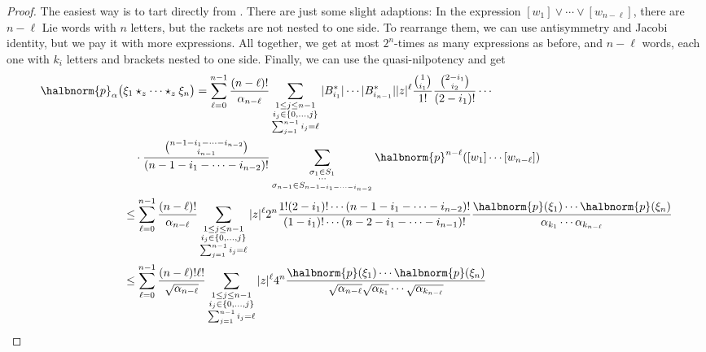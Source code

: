 \documentclass[
11pt,                          %
english                        %
]{article}
\begin{document}
\begin{proof}
	The easiest way is to tart directly from \cite[Equation (5.3.14)]{stapor:2015a}.
	There are just some slight adaptions: In the expression 
	$[w_1] \vee \cdots \vee [w_{n-\ell}]$, there are $n - \ell$ Lie words with $n$
	letters, but the rackets are not nested to one side. To rearrange them, we can 
	use antisymmetry and Jacobi identity, but we pay it with more expressions. All 
	together, we get at most $2^n$-times as many expressions as before, and $n - 
	\ell$ words, each one with $k_i$ letters and brackets nested to one side. 
	Finally, we can use the quasi-nilpotency and get
	\begin{align*}
		\halbnorm{p}_\alpha
		\big(
		&
			\xi_1 \star_z \cdots \star_z \xi_n
		\big)
		=
		\sum\limits_{\ell = 0}^{n-1}
		\frac{(n-\ell)!}{\alpha_{n - \ell}}
		\sum\limits_{\substack{
			1 \leq j \leq n-1 \\
			i_j \in \{0, \ldots, j\} \\
			\sum_{j=1}^{n-1} i_j = \ell
		}}
		|B_{i_1}^*| \cdots |B_{i_{n-1}}^*|
		|z|^\ell
		\frac{\binom{1}{i_1}}{1!}
		\frac{\binom{2 - i_1}{i_2}}{(2 - i_1)!}
		\cdots
		\\
		& \quad \cdot
		\frac{\binom{n - 1 - i_1 - \cdots - i_{n-2}}{i_{n-1}}}
		{(n - 1 - i_1 - \cdots - i_{n-2})!}
		\sum\limits_{\substack{
			\sigma_1 \in S_1 \\
			\cdots \\
			\sigma_{n-1} \in S_{n - 1 - i_1 - \cdots - i_{n-2}} 
		}}
		\halbnorm{p}^{n-\ell}
		([w_1] \cdots [w_{n-\ell}])
		\\
		& \leq
		\sum\limits_{\ell = 0}^{n-1}
		\frac{(n-\ell)!}{\alpha_{n - \ell}}
		\sum\limits_{\substack{
			1 \leq j \leq n-1 \\
			i_j \in \{0, \ldots, j\} \\
			\sum_{j=1}^{n-1} i_j = \ell
		}}
		|z|^\ell
		2^n
		\frac{1! (2 - i_1)! \cdots (n-1-i_1- \cdots - i_{n-2})!}
		{(1 - i_1)! \cdots (n-2-i_1- \cdots - i_{n-1})!}
		\frac{\halbnorm{p}(\xi_1) \cdots \halbnorm{p}(\xi_n)}
		{\alpha_{k_1} \cdots \alpha_{k_{n - \ell}}}
		\\
		& \leq
		\sum\limits_{\ell = 0}^{n-1}
		\frac{(n-\ell)! \ell!}{\sqrt{\alpha_{n - \ell}}}
		\sum\limits_{\substack{
			1 \leq j \leq n-1 \\
			i_j \in \{0, \ldots, j\} \\
			\sum_{j=1}^{n-1} i_j = \ell
		}}
		|z|^\ell
		4^n
		\frac{\halbnorm{p}(\xi_1) \cdots \halbnorm{p}(\xi_n)}
		{\sqrt{\alpha_{n - \ell}} 
		\sqrt{\alpha_{k_1}} \cdots \sqrt{\alpha_{k_{n - \ell}}}}		

\end{align*}
\end{proof}
\end{document}
